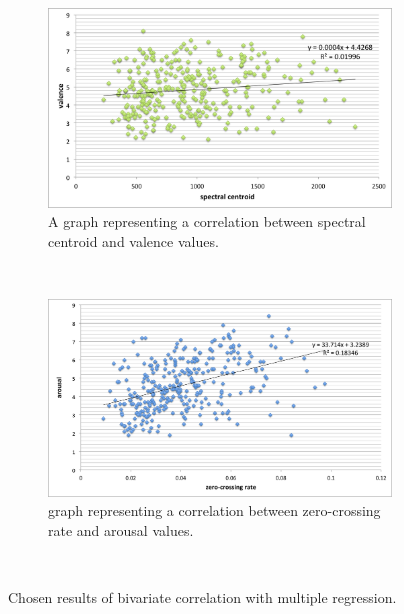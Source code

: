\begin{figure}
        \centering
        \begin{subfigure}[b]{0.48\textwidth}
                \includegraphics[width=\textwidth]{Figures/spectralcentroid-valence}
                \caption{A graph representing a correlation between spectral centroid and valence values.}
                \label{fig:is }
        \end{subfigure}%
        ~ %
        \begin{subfigure}[b]{0.48\textwidth}
                \includegraphics[width=\textwidth]{Figures/zerocrossing-arousal}
                \caption{ graph representing a correlation between zero-crossing rate and arousal values.}
                \label{fig:simtunes}
        \end{subfigure}
          \caption{Chosen results of bivariate correlation with multiple regression.}
        ~ %
\end{figure}



